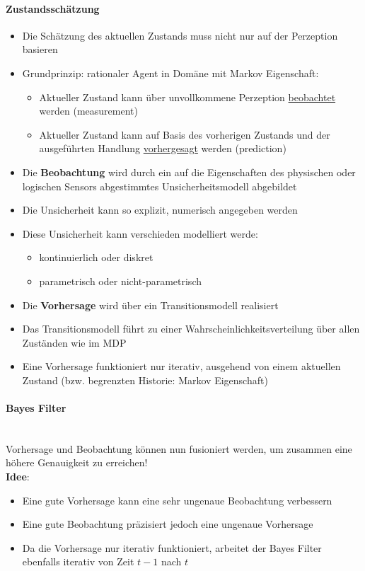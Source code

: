 \paragraph{Zustandssch\"atzung}
\begin{itemize}
	\item Die Sch\"atzung des aktuellen Zustands muss nicht nur auf der Perzeption basieren
	\item Grundprinzip: rationaler Agent in Dom\"ane mit Markov Eigenschaft:
	\begin{itemize}
		\item Aktueller Zustand kann \"uber unvollkommene Perzeption \underline{beobachtet} werden (measurement)
		\item Aktueller Zustand kann auf Basis des vorherigen Zustands und der ausgef\"uhrten Handlung \underline{vorhergesagt} werden (prediction)
	\end{itemize}
	\item Die \textbf{Beobachtung} wird durch ein auf die Eigenschaften des physischen oder logischen Sensors abgestimmtes Unsicherheitsmodell abgebildet
	\item Die Unsicherheit kann so explizit, numerisch angegeben werden
	\item Diese Unsicherheit kann verschieden modelliert werde:
	\begin{itemize}
		\item kontinuierlich oder diskret
		\item parametrisch oder nicht-parametrisch
	\end{itemize}
	\item Die \textbf{Vorhersage} wird \"uber ein Transitionsmodell realisiert
	\item Das Transitionsmodell f\"uhrt zu einer Wahrscheinlichkeitsverteilung \"uber allen Zust\"anden wie im MDP
	\item Eine Vorhersage funktioniert nur iterativ, ausgehend von einem aktuellen Zustand (bzw. begrenzten Historie: Markov Eigenschaft)
\end{itemize}

\paragraph{Bayes Filter} {\ }\\
Vorhersage und Beobachtung k\"onnen nun fusioniert werden, um zusammen eine h\"ohere Genauigkeit zu erreichen!\\

\textbf{Idee}:
\begin{itemize}
	\item Eine gute Vorhersage kann eine sehr ungenaue Beobachtung verbessern
	\item Eine gute Beobachtung pr\"azisiert jedoch eine ungenaue Vorhersage
	\item Da die Vorhersage nur iterativ funktioniert, arbeitet der Bayes Filter ebenfalls iterativ von Zeit $t-1$ nach $t$ 
\end{itemize}

